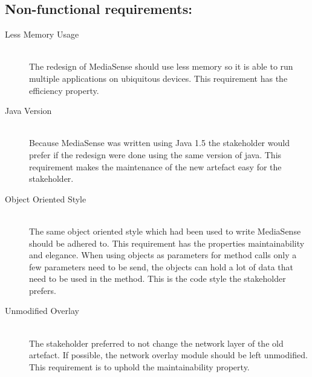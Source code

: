 \subsection{Non-functional requirements:}
\begin{description}
	\item[Less Memory Usage] \hfill \\
	The redesign of MediaSense should use less memory so it is able to run multiple applications on ubiquitous devices. This requirement has the efficiency property.

	\item[Java Version] \hfill \\
	Because MediaSense was written using Java 1.5 the stakeholder would prefer if the redesign were done using the same version of java. This requirement makes the maintenance of the new artefact easy for the stakeholder. 
	
	\item[Object Oriented Style] \hfill \\
	The same object oriented style which had been used to write MediaSense should be adhered to. This requirement has the properties maintainability and elegance. When using objects as parameters for method calls only a few parameters need to be send, the objects can hold a lot of data that need to be used in the method. This is the code style the stakeholder prefers. 
	
	\item[Unmodified Overlay] \hfill \\
	The stakeholder preferred to not change the network layer of the old artefact. If possible, the network overlay module should be left unmodified. This requirement is to uphold the maintainability property.
\end{description}	



